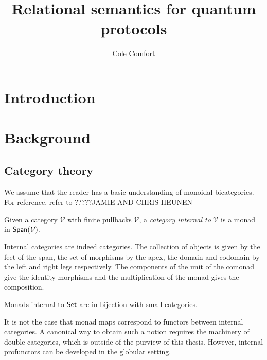 \documentclass[12pt]{ociamthesis}  %
\title{Relational semantics for quantum protocols}
\author{Cole Comfort}
\newcommand{\Set}{\Sets}
\begin{document}
\maketitle

\tableofcontents


\chapter{Introduction}


\chapter{Background}

\section{Category theory}





We assume that the reader has a basic understanding of monoidal bicategories.  For reference, refer to ?????JAMIE AND CHRIS HEUNEN


\begin{definition}
\end{definition}



\begin{definition}
\end{definition}



\begin{definition}
Given a category $\mathcal V$ with finite pullbacks $\mathcal V$, a {\it category internal to} $\mathcal V$ is a monad in $\mathsf{Span}(\mathcal V)$.
\end{definition}

Internal categories are indeed categories.  The collection of objects is given by the feet of the span, the set of morphisms by the apex, the domain and codomain by the left and right legs respectively.  The components of the unit of the comonad give the identity morphisms and the multiplication of the monad gives the composition.

\begin{lemma}
Monads internal to $\Set$ are in bijection with small categories.
\end{lemma}

It is not the case that monad maps correspond to functors between internal categories.  A canonical way to obtain such a notion requires the machinery of double categories, which is outside of the purview of this thesis.  However, internal profunctors can be developed in the globular setting.
\end{document}
